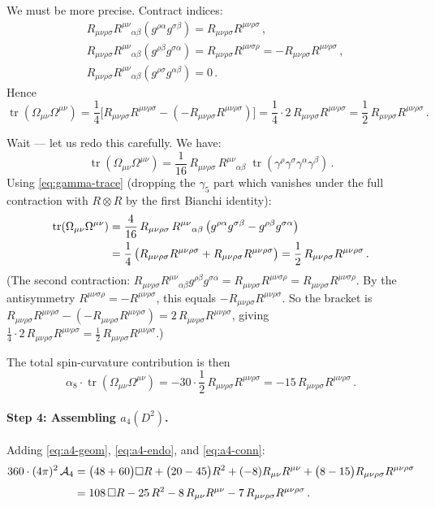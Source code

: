 \documentclass[12pt,a4paper]{article}
\theoremstyle{definition}
\theoremstyle{remark}
\newcommand{\tr}{\operatorname{tr}}
\newcommand{\Rsq}{R_{\mu\nu\rho\sigma}R^{\mu\nu\rho\sigma}}
\newcommand{\Ricsq}{R_{\mu\nu}R^{\mu\nu}}
\begin{document}
We must be more precise.  Contract indices:
\begin{align}
  &R_{\mu\nu\rho\sigma}R^{\mu\nu}{}_{\alpha\beta}
    (g^{\rho\alpha}g^{\sigma\beta}) = \Rsq\,,\\
  &R_{\mu\nu\rho\sigma}R^{\mu\nu}{}_{\alpha\beta}
    (g^{\rho\beta}g^{\sigma\alpha})
  = R_{\mu\nu\rho\sigma}R^{\mu\nu\sigma\rho}
  = -\Rsq\,,\\
  &R_{\mu\nu\rho\sigma}R^{\mu\nu}{}_{\alpha\beta}
    (g^{\rho\sigma}g^{\alpha\beta}) = 0\,.
\end{align}
Hence
\begin{equation}
  \tr(\Omega_{\mu\nu}\Omega^{\mu\nu})
  = \frac{1}{4}\bigl[\Rsq - (-\Rsq)\bigr]
  = \frac{1}{4}\cdot 2\,\Rsq
  = \frac{1}{2}\,\Rsq\,.
  \label{eq:OmOm-trace}
\end{equation}

Wait --- let us redo this carefully.  We have:
\[
  \tr(\Omega_{\mu\nu}\Omega^{\mu\nu})
  = \frac{1}{16}\,R_{\mu\nu\rho\sigma}\,R^{\mu\nu}{}_{\alpha\beta}\;
    \tr(\gamma^\rho\gamma^\sigma\gamma^\alpha\gamma^\beta)\,.
\]
Using \eqref{eq:gamma-trace} (dropping the $\gamma_5$ part which vanishes
under the full contraction with $R \otimes R$ by the first Bianchi
identity):
\begin{align}
  \tr(\Omega_{\mu\nu}\Omega^{\mu\nu})
  &= \frac{4}{16}\,R_{\mu\nu\rho\sigma}\,R^{\mu\nu}{}_{\alpha\beta}\,
     \bigl(g^{\rho\alpha}g^{\sigma\beta}
           - g^{\rho\beta}g^{\sigma\alpha}\bigr)
  \notag\\
  &= \frac{1}{4}\,\bigl(\Rsq + \Rsq\bigr)
  = \frac{1}{2}\,\Rsq\,.
  \label{eq:OmOm-final}
\end{align}
(The second contraction:
$R_{\mu\nu\rho\sigma}R^{\mu\nu}{}_{\alpha\beta}g^{\rho\beta}g^{\sigma\alpha}
= R_{\mu\nu\rho\sigma}R^{\mu\nu\sigma\rho}
= R_{\mu\nu\rho\sigma}R^{\mu\nu\sigma\rho}$.
By the antisymmetry $R^{\mu\nu\sigma\rho}=-R^{\mu\nu\rho\sigma}$,
this equals $-\Rsq$.  So the bracket is
$\Rsq - (-\Rsq) = 2\,\Rsq$, giving $\frac{1}{4}\cdot 2\,\Rsq
= \frac{1}{2}\,\Rsq$.) \checkmark

\medskip
The total spin-curvature contribution is then
\begin{equation}
  \alpha_8 \cdot \tr(\Omega_{\mu\nu}\Omega^{\mu\nu})
  = -30 \cdot \frac{1}{2}\,\Rsq
  = -15\,\Rsq\,.
  \label{eq:a4-conn}
\end{equation}


\paragraph{Step 4: Assembling $a_4(D^2)$.}
Adding \eqref{eq:a4-geom}, \eqref{eq:a4-endo}, and \eqref{eq:a4-conn}:
\begin{align}
  360 \cdot (4\pi)^2\, \mathcal{A}_4
  &= \bigl(48 + 60\bigr)\Box R
   + \bigl(20 - 45\bigr)R^2
   + (-8)\Ricsq
   + \bigl(8 - 15\bigr)\Rsq
  \notag\\[3pt]
  &= 108\,\Box R - 25\,R^2 - 8\,\Ricsq - 7\,\Rsq\,.
\end{align}
\end{document}

